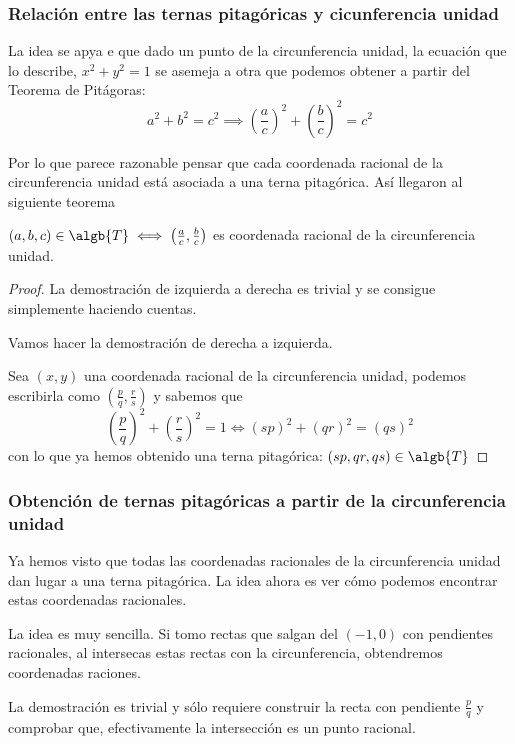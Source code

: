 \documentclass{apuntes}
\begin{document}
\subsubsection{Relación entre las ternas pitagóricas y cicunferencia unidad}

La idea se apya e que dado un punto de la circunferencia unidad, la ecuación que lo describe, $x^2+y^2=1$ se asemeja a otra que podemos obtener a partir del Teorema de Pitágoras:
\[a^2+b^2=c^2 \implies \left(\frac{a}{c}\right)^2 + \left(\frac{b}{c} \right)^2 = c^2\]

Por lo que parece razonable pensar que cada coordenada racional de la circunferencia unidad está asociada a una terna pitagórica. Así llegaron al siguiente teorema

\begin{theorem}
$(a,b,c)\in \algb{T} \iff \left( \frac{a}{c},\frac{b}{c}\right)$ es coordenada racional de la circunferencia unidad.
\end{theorem}
\begin{proof}
La demostración de izquierda a derecha es trivial y se consigue simplemente haciendo cuentas.

Vamos hacer la demostración de derecha a izquierda.

Sea $(x,y)$ una coordenada racional de la circunferencia unidad, podemos escribirla como $(\frac{p}{q},\frac{r}{s})$ y sabemos que
\[\left( \frac{p}{q}\right)^2 + \left( \frac{r}{s}\right)^2 = 1 \iff (sp)^2+(qr)^2=(qs)^2\]
con lo que ya hemos obtenido una terna pitagórica: $(sp,qr,qs)\in \algb{T}$
\end{proof}

\subsubsection{Obtención de ternas pitagóricas a partir de la circunferencia unidad}

Ya hemos visto que todas las coordenadas racionales de la circunferencia unidad dan lugar a una terna pitagórica. La idea ahora es ver cómo podemos encontrar estas coordenadas racionales.

La idea es muy sencilla. Si tomo rectas que salgan del $(-1,0)$ con pendientes racionales, al intersecas estas rectas con la circunferencia, obtendremos coordenadas raciones.

La demostración es trivial y sólo requiere construir la recta con pendiente $\frac{p}{q}$ y comprobar que, efectivamente la intersección es un punto racional.
\end{document}
